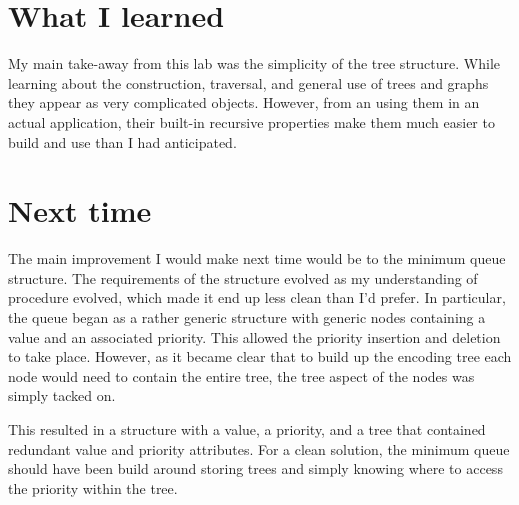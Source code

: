 \documentclass[a4paper,12pt]{article}
\begin{document}

\section{What I learned}
My main take-away from this lab was the simplicity of the tree structure.  While learning about the construction, traversal, and general use of trees and graphs they appear as very complicated objects.  However, from an using them in an actual application, their built-in recursive properties make them much easier to build and use than I had anticipated.


\section{Next time}
The main improvement I would make next time would be to the minimum queue structure.  The requirements of the structure evolved as my understanding of procedure evolved, which made it end up less clean than I'd prefer.  In particular, the queue began as a rather generic structure with generic nodes containing a value and an associated priority.  This allowed the priority insertion and deletion to take place.  However, as it became clear that to build up the encoding tree each node would need to contain the entire tree, the tree aspect of the nodes was simply tacked on.

This resulted in a structure with a value, a priority, and a tree that contained redundant value and priority attributes.  For a clean solution, the minimum queue should have been build around storing trees and simply knowing where to access the priority within the tree.

\end{document}
